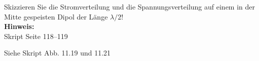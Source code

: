 \begin{question}[section=11,name={Strom-/Spannungsverteilung auf Dipol},difficulty=,quantity=6,type=thr,tags={20151210}]
	Skizzieren Sie die Stromverteilung und die Spannungsverteilung auf einem in der Mitte gespeisten Dipol der Länge $\lambda/2$!
	\\ \textbf{Hinweis:}\\
	Skript Seite 118--119
\end{question}
\begin{solution}
	Siehe Skript Abb. 11.19 und 11.21
\end{solution}